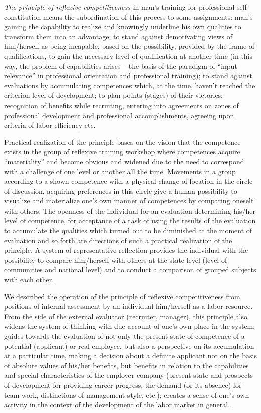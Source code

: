 \documentclass[conference]{IEEEtran}
\begin{document}
\textit{The principle of reflexive competitiveness} in man’s training for professional self-constitution means the subordination of this process to some assignments: man’s gaining the capability to realize and knowingly underline his own qualities to transform them into an advantage; to stand against demotivating views of him/herself as being incapable, based on the possibility, provided by the frame of qualifications, to gain the necessary level of qualification at another time (in this way, the problem of capabilities arises – the basis of the paradigm of “input relevance” in professional orientation and professional training); to stand against evaluations by accumulating competences which, at the time, haven’t reached the criterion level of development; to plan points (stages) of their victories: recognition of benefits while recruiting, entering into agreements on zones of professional development and professional accomplishments, agreeing upon criteria of labor efficiency etc.

Practical realization of the principle bases on the vision that the competence exists in the group of reflexive training workshop \cite{b12} where competences acquire “materiality” and become obvious and widened due to the need to correspond with a challenge of one level or another all the time. Movements in a group according to a shown competence with a physical change of location in the circle of discussion, acquiring preferences in this circle give a human possibility to visualize and materialize one’s own manner of competences by comparing oneself with others. The openness of the individual for an evaluation determining his/her level of competence, for acceptance of a task of using the results of the evaluation to accumulate the qualities which turned out to be diminished at the moment of evaluation and so forth are directions of such a practical realization of the principle. A system of representative reflection \cite{b12}  provides the individual with the possibility to compare him/herself with others at the state level (level of communities and national level) and to conduct a comparison of grouped subjects with each other.

We described the operation of the principle of reflexive competitiveness from positions of internal assessment by an individual him/herself as a labor resource. From the side of the external evaluator (recruiter, manager), this principle also widens the system of thinking with due account of one’s own place in the system: guides towards the evaluation of not only the present state of competence of a potential (applicant) or real employee, but also a perspective on its accumulation at a particular time, making a decision about a definite applicant not on the basis of absolute values of his/her benefits, but benefits in relation to the capabilities and special characteristics of the employer company (present state and prospects of development for providing career progress, the demand (or its absence) for team work, distinctions of management style, etc.); creates a sense of one’s own activity in the context of the development of the labor market in general.
\end{document}
